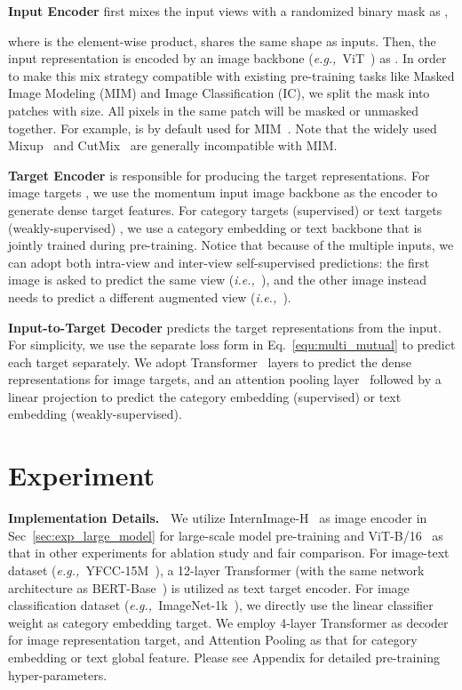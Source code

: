 \documentclass[10pt,twocolumn,letterpaper]{article}
\def\eg{\textit{e.g.,~}}
\def\ie{\textit{i.e.,~}}
\begin{document}
\vspace{0.5em}\noindent\textbf{Input Encoder } first mixes the input views with a randomized binary mask  as ,

where  is the element-wise product,  shares the same shape as inputs. Then, the input representation is encoded by an image backbone (\eg ViT~\cite{dosovitskiy2020image}) as .
In order to make this mix strategy compatible with existing pre-training tasks like Masked Image Modeling (MIM) and Image Classification (IC), we split the mask  into patches with  size. All pixels in the same patch will be masked or unmasked together. For example,  is by default used for MIM~\cite{he2022masked, bao2021beit}. Note that the widely used Mixup~\cite{zhang2017mixup} and CutMix~\cite{yun2019cutmix} are generally incompatible with MIM.


\vspace{0.5em}\noindent\textbf{Target Encoder } is responsible for producing the target representations. 
For image targets , we use the momentum input image backbone as the encoder to generate dense target features. For category targets (supervised) or text targets (weakly-supervised) , we use a category embedding or text backbone that is jointly trained during pre-training. Notice that because of the multiple inputs, we can adopt both intra-view and inter-view self-supervised predictions: the first image  is asked to predict the same view (\ie ), and the other image  instead needs to predict a different augmented view (\ie ).

\vspace{0.5em}\noindent\textbf{Input-to-Target Decoder } predicts the target representations from the input. For simplicity, we use the separate loss form in Eq.~\eqref{equ:multi_mutual} to predict each target separately. We adopt Transformer~\cite{vaswani2017attention} layers to predict the dense representations for image targets, and an attention pooling layer~\cite{chen2022context} followed by a linear projection to predict the category embedding (supervised) or text embedding (weakly-supervised).

 \section{Experiment}
\label{sec:exp}
\noindent\textbf{Implementation Details.~}  We utilize InternImage-H~\cite{anonymous2022internimg} as image encoder in Sec~\ref{sec:exp_large_model} for large-scale model pre-training and ViT-B/16~\cite{dosovitskiy2020image} as that in other experiments for ablation study and fair comparison. For image-text dataset (\eg YFCC-15M~\cite{thomee2016yfcc100m}), a 12-layer Transformer (with the same network architecture as BERT-Base~\cite{devlin2018bert}) is utilized as text target encoder. For image classification dataset (\eg ImageNet-1k~\cite{deng2009imagenet}), we directly use the linear classifier weight as category embedding target. We employ 4-layer Transformer as decoder for image representation target, and Attention Pooling as that for category embedding or text global feature. Please see Appendix for detailed pre-training hyper-parameters.
\end{document}
